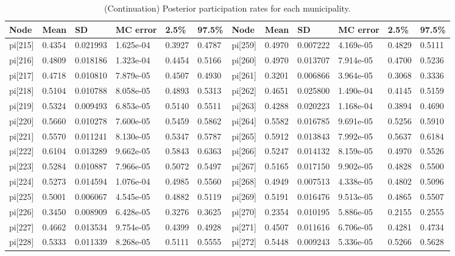\documentclass[12pt]{article}
\begin{document}
\begin{table}[h!]
\centering
\tiny
\caption{(Continuation) Posterior participation rates for each municipality.}
\label{tab:params2}
\begin{tabular}{|llllll|llllll}
\hline
\textbf{Node} & \textbf{Mean} & \textbf{SD} & \textbf{MC error} & \textbf{2.5\%} &  \textbf{97.5\%} & \textbf{Node} & \textbf{Mean} & \textbf{SD} & \textbf{MC error} & \textbf{2.5\%} &  \textbf{97.5\%} \\ \hline
pi[215] & 0.4354 & 0.021993  & 1.625e-04 &0.3927 &0.4787 & pi[259] & 0.4970 & 0.007222 & 4.169e-05 & 0.4829 & 0.5111 \\ 
pi[216] & 0.4809 & 0.018186  & 1.323e-04 &0.4454 &0.5166 &  pi[260] & 0.4970 & 0.013707 & 7.914e-05 & 0.4700 &0.5236 \\ 
pi[217] & 0.4718 & 0.010810  & 7.879e-05 &0.4507 &0.4930 &  pi[261] & 0.3201 & 0.006866 & 3.964e-05 & 0.3068 &0.3336 \\ 
pi[218] & 0.5104 & 0.010788  & 8.058e-05 &0.4893 &0.5313 & pi[262] & 0.4651 & 0.025800 & 1.490e-04 & 0.4145 &0.5159 \\
pi[219] & 0.5324 & 0.009493  & 6.853e-05 &0.5140 &0.5511 &  pi[263] & 0.4288 & 0.020223 & 1.168e-04 & 0.3894 &0.4690 \\ 
pi[220] & 0.5660 & 0.010278  & 7.600e-05 &0.5459 &0.5862 & pi[264] & 0.5582 & 0.016785 & 9.691e-05 & 0.5256 &0.5910 \\ 
pi[221] & 0.5570 & 0.011241  & 8.130e-05 &0.5347 &0.5787 & pi[265] & 0.5912 & 0.013843 & 7.992e-05 & 0.5637 &0.6184 \\ 
pi[222] & 0.6104 & 0.013289  & 9.662e-05 &0.5843 &0.6363 & pi[266] & 0.5247 & 0.014132 & 8.159e-05 & 0.4970 &0.5526 \\ 
pi[223] & 0.5284 & 0.010887  & 7.966e-05 &0.5072 &0.5497 & pi[267] & 0.5165 & 0.017150 & 9.902e-05 & 0.4828 &0.5500 \\ 
pi[224] & 0.5273 & 0.014594  & 1.076e-04 &0.4985 &0.5560 & pi[268] & 0.4949 & 0.007513 & 4.338e-05 & 0.4802 &0.5096  \\ 
pi[225] & 0.5001 & 0.006067  & 4.545e-05 &0.4882 &0.5119 & pi[269] & 0.5191 & 0.016476 & 9.513e-05 & 0.4865 &0.5507 \\ 
pi[226] & 0.3450 & 0.008909  & 6.428e-05 &0.3276 &0.3625 & pi[270] & 0.2354 & 0.010195 & 5.886e-05 & 0.2155 &0.2555 \\ 
pi[227] & 0.4662 & 0.013534  & 9.754e-05 &0.4399 &0.4928 & pi[271] & 0.4507 & 0.011616 & 6.706e-05 & 0.4281 &0.4734  \\ 
pi[228] & 0.5333 & 0.011339  & 8.268e-05 &0.5111 &0.5555 & pi[272] & 0.5448 & 0.009243 & 5.336e-05 & 0.5266 &0.5628 \\ 

\end{tabular}
\end{table}
\end{document}
